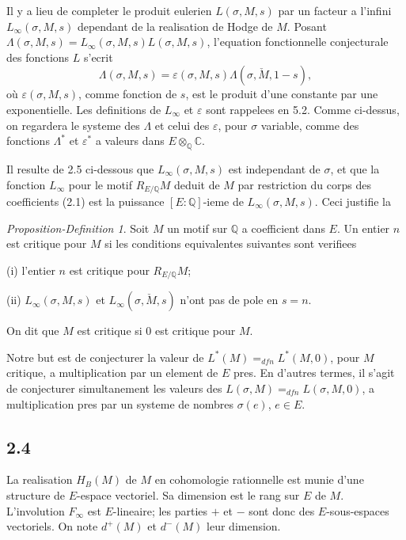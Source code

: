 \documentclass[12pt,a4paper]{article}
\theoremstyle{plain}
\theoremstyle{definition}
\theoremstyle{remark}
\newtheorem{proposition-definition}[theorem]{Proposition-Definition}
\newcommand{\Q}{\mathbb{Q}}
\newcommand{\C}{\mathbb{C}}
\begin{document}
Il y a lieu de completer le produit eulerien $L(\sigma, M, s)$ par un facteur a l'infini
$L_\infty(\sigma, M, s)$ dependant de la realisation de Hodge de $M$. Posant
$\Lambda(\sigma, M, s) = L_\infty(\sigma, M, s) L(\sigma, M, s)$, l'equation fonctionnelle conjecturale
des fonctions $L$ s'ecrit
\begin{equation}\label{eq:2.2.3}
\Lambda(\sigma, M, s) = \varepsilon(\sigma, M, s) \Lambda(\sigma, \check{M}, 1-s),
\end{equation}
o\`u $\varepsilon(\sigma, M, s)$, comme fonction de $s$, est le produit d'une constante par une exponentielle.
Les definitions de $L_\infty$ et $\varepsilon$ sont rappelees en 5.2. Comme ci-dessus, on regardera le
systeme des $\Lambda$ et celui des $\varepsilon$, pour $\sigma$ variable, comme des fonctions
$\Lambda^*$ et $\varepsilon^*$ a valeurs dans $E \otimes_\Q \C$.

Il resulte de 2.5 ci-dessous que $L_\infty(\sigma, M, s)$ est independant de $\sigma$, et que la fonction
$L_\infty$ pour le motif $R_{E/\Q} M$ deduit de $M$ par restriction du corps des coefficients
(2.1) est la puissance $[E:\Q]$-ieme de $L_\infty(\sigma, M, s)$. Ceci justifie la

\begin{proposition-definition}\label{prop:2.3}
Soit $M$ un motif sur $\Q$ a coefficient dans $E$. Un entier $n$ est critique pour $M$ si les
conditions equivalentes suivantes sont verifiees

\textup{(i)} l'entier $n$ est critique pour $R_{E/\Q} M$;

\textup{(ii)} $L_\infty(\sigma, M, s)$ et $L_\infty(\sigma, \check{M}, s)$ n'ont pas de pole en $s = n$.

On dit que $M$ est critique si $0$ est critique pour $M$.
\end{proposition-definition}

Notre but est de conjecturer la valeur de $L^*(M) =_{dfn} L^*(M, 0)$, pour $M$ critique,
a multiplication par un element de $E$ pres. En d'autres termes, il s'agit de conjecturer
simultanement les valeurs des $L(\sigma, M) =_{dfn} L(\sigma, M, 0)$, a multiplication pres par
un systeme de nombres $\sigma(e)$, $e \in E$.

\subsection*{2.4}

La realisation $H_B(M)$ de $M$ en cohomologie rationnelle est munie d'une structure
de $E$-espace vectoriel. Sa dimension est le rang sur $E$ de $M$. L'involution $F_\infty$
est $E$-lineaire; les parties $+$ et $-$ sont donc des $E$-sous-espaces vectoriels. On note
$d^+(M)$ et $d^-(M)$ leur dimension.
\end{document}

